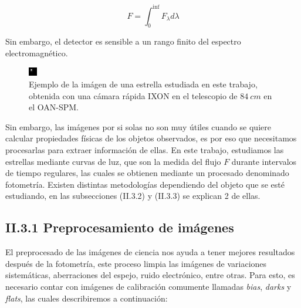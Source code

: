 \begin{equation}
  \displaystyle F = \int_{0}^{\inf} F_{\lambda}d\lambda
\end{equation}

Sin embargo, el detector es sensible a un rango finito del espectro electromagnético.


\begin{figure}[h!]
  \centering
    \includegraphics[scale=8]{./figures/wasp74b.png}
   \caption{Ejemplo de la imágen de una estrella estudiada en este trabajo, obtenida con una cámara rápida IXON en el telescopio de $84~cm$ en el OAN-SPM.}
    \label{fig_2_5_WASP-74b}
\end{figure}

Sin embargo, las imágenes por si solas no son muy útiles cuando se quiere calcular propiedades físicas de los objetos observados, es por eso que necesitamos procesarlas para extraer información de ellas. En este trabajo, estudiamos las estrellas mediante curvas de luz, que son la medida del flujo $F$ durante intervalos de tiempo regulares, las cuales se obtienen mediante un procesado denominado fotometría. Existen distintas metodologías dependiendo del objeto que se esté estudiando, en las subsecciones (II.3.2) y (II.3.3) se explican 2 de ellas.

\subsection*{II.3.1 Preprocesamiento de imágenes}

El preprocesado de las imágenes de ciencia nos ayuda a tener mejores resultados después de la fotometría, este proceso limpia las imágenes de variaciones sistemáticas, aberraciones del espejo, ruido electrónico, entre otras. Para esto, es necesario contar con imágenes de calibración comumente llamadas \textit{bias}, \textit{darks} y \textit{flats}, las cuales describiremos a continuación:

